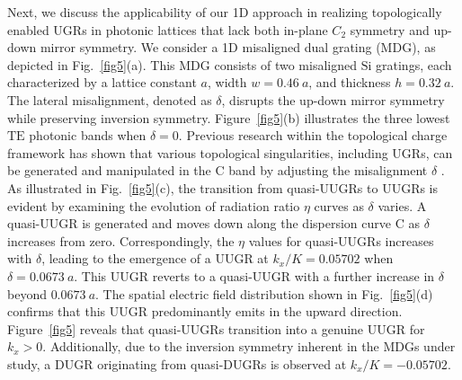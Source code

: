 \documentclass[%
 reprint,
superscriptaddress,
 amsmath,amssymb, aps,
]{revtex4-1}
\begin{document}
Next, we discuss the applicability of our 1D approach  in realizing topologically enabled UGRs in photonic lattices that lack both in-plane $C_2$ symmetry and up-down mirror symmetry. We consider a 1D misaligned dual grating (MDG), as depicted in Fig.~\ref{fig5}(a). This MDG consists of two misaligned $\mathrm{Si}$ gratings, each characterized by a lattice constant $a$, width $w=0.46~a$, and thickness $h=0.32~a$. The lateral misalignment, denoted as $\delta$, disrupts the up-down mirror symmetry while preserving inversion symmetry. Figure~\ref{fig5}(b) illustrates the three lowest $\mathrm{TE}$ photonic bands when $\delta =0$. Previous research within the topological charge framework has shown that various topological singularities, including UGRs, can be generated and manipulated in the $\mathrm{C}$ band by adjusting the misalignment $\delta$ \cite{YZeng2021}. As illustrated in Fig.~\ref{fig5}(c), the transition from quasi-UUGRs to UUGRs is evident by examining the evolution of radiation ratio $\eta$ curves as $\delta$ varies. A quasi-UUGR is generated and moves down along the dispersion curve $\mathrm{C}$ as $\delta$ increases from zero. Correspondingly, the $\eta$ values for quasi-UUGRs increases with $\delta$, leading to the emergence of a UUGR at $k_x/K=0.05702$ when $\delta=0.0673~a$. This UUGR reverts to a quasi-UUGR with a further increase in $\delta$ beyond $0.0673~a$. The spatial electric field distribution shown in Fig.~\ref{fig5}(d) confirms that this UUGR predominantly emits in the upward direction. Figure~\ref{fig5} reveals that quasi-UUGRs transition into a genuine UUGR for $k_x >0$. Additionally, due to the inversion symmetry inherent in the MDGs under study, a DUGR originating from quasi-DUGRs is observed at  $k_x/K=-0.05702$.
\end{document}
